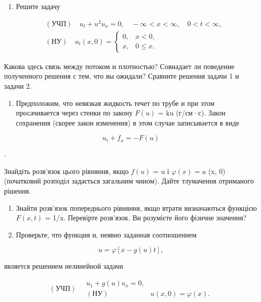 \documentclass[
  ukrainian,
]{article}
\providecommand{\tightlist}{%
  \setlength{\itemsep}{0pt}\setlength{\parskip}{0pt}}
\begin{document}
\begin{enumerate}
\def\labelenumi{\arabic{enumi}.}
\setcounter{enumi}{1}
\tightlist
\item
  Решите задачу
\end{enumerate}

\[
\begin{split} & (\text{УЧП}) \quad u_t + u^2 u_x = 0, \quad -\infty < x < \infty, \quad 0 < t < \infty, \\ & (\text{НУ}) \quad u_t(x, 0) = \begin{cases} 0, & x < 0, \\ x, & 0 \leqslant x. \end{cases} \end{split}
\]

Какова здесь связь между потоком и плотностью? Совнадает ли поведение
полученного решения с тем, что вы ожидали? Сравните решения задачи 1 и
задачи 2.

\begin{enumerate}
\def\labelenumi{\arabic{enumi}.}
\setcounter{enumi}{2}
\tightlist
\item
  Предположим, что невязкая жидкость течет по трубе и при этом
  просачивается через стенки по закону \(F(u)\) = ku (г/см·с). Закон
  сохранения (скорее закон изменения) в этом случае записывается в виде
\end{enumerate}

\[
u_t + f_x = -F(u)
\]

.

Знайдіть розв'язок цього рівняння, якщо \(f(u)\) = u і
\(\varphi(x) = u\) (x, 0) (початковий розподіл задається загальним
чином). Дайте тлумачення отриманого рішення.

\begin{enumerate}
\def\labelenumi{\arabic{enumi}.}
\setcounter{enumi}{3}
\item
  Знайти розв'язок попереднього рівняння, якщо втрати визначаються
  функцією \(F(x, t)\) = 1/x. Перевірте розв'язок. Ви розумієте його
  фізичне значення?
\item
  Проверьте, что функция и, неявно заданная соотношением
\end{enumerate}

\[
u = \varphi[x - g(u) t],
\]

является решением нелинейной задачи

\[
(\text{УЧП}) \quad \begin{array}{ll} u_1 + g(u) u_x = 0, \\ (\text{НУ}) & u(x, 0) = \varphi(x). \end{array}
\]
\end{document}
